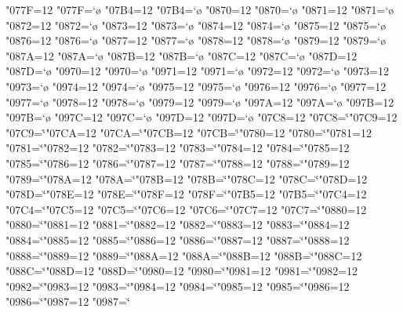 \catcode"077F=12 \lccode"077F=`\o
\catcode"07B4=12 \lccode"07B4=`\o
\catcode"0870=12 \lccode"0870=`\o
\catcode"0871=12 \lccode"0871=`\o
\catcode"0872=12 \lccode"0872=`\o
\catcode"0873=12 \lccode"0873=`\o
\catcode"0874=12 \lccode"0874=`\o
\catcode"0875=12 \lccode"0875=`\o
\catcode"0876=12 \lccode"0876=`\o
\catcode"0877=12 \lccode"0877=`\o
\catcode"0878=12 \lccode"0878=`\o
\catcode"0879=12 \lccode"0879=`\o
\catcode"087A=12 \lccode"087A=`\o
\catcode"087B=12 \lccode"087B=`\o
\catcode"087C=12 \lccode"087C=`\o
\catcode"087D=12 \lccode"087D=`\o
\catcode"0970=12 \lccode"0970=`\o
\catcode"0971=12 \lccode"0971=`\o
\catcode"0972=12 \lccode"0972=`\o
\catcode"0973=12 \lccode"0973=`\o
\catcode"0974=12 \lccode"0974=`\o
\catcode"0975=12 \lccode"0975=`\o
\catcode"0976=12 \lccode"0976=`\o
\catcode"0977=12 \lccode"0977=`\o
\catcode"0978=12 \lccode"0978=`\o
\catcode"0979=12 \lccode"0979=`\o
\catcode"097A=12 \lccode"097A=`\o
\catcode"097B=12 \lccode"097B=`\o
\catcode"097C=12 \lccode"097C=`\o
\catcode"097D=12 \lccode"097D=`\o
\catcode"07C8=12 \lccode"07C8=`\r
\catcode"07C9=12 \lccode"07C9=`\r
\catcode"07CA=12 \lccode"07CA=`\r
\catcode"07CB=12 \lccode"07CB=`\r
\catcode"0780=12 \lccode"0780=`\u
\catcode"0781=12 \lccode"0781=`\u
\catcode"0782=12 \lccode"0782=`\u
\catcode"0783=12 \lccode"0783=`\u
\catcode"0784=12 \lccode"0784=`\u
\catcode"0785=12 \lccode"0785=`\u
\catcode"0786=12 \lccode"0786=`\u
\catcode"0787=12 \lccode"0787=`\u
\catcode"0788=12 \lccode"0788=`\u
\catcode"0789=12 \lccode"0789=`\u
\catcode"078A=12 \lccode"078A=`\u
\catcode"078B=12 \lccode"078B=`\u
\catcode"078C=12 \lccode"078C=`\u
\catcode"078D=12 \lccode"078D=`\u
\catcode"078E=12 \lccode"078E=`\u
\catcode"078F=12 \lccode"078F=`\u
\catcode"07B5=12 \lccode"07B5=`\u
\catcode"07C4=12 \lccode"07C4=`\u
\catcode"07C5=12 \lccode"07C5=`\u
\catcode"07C6=12 \lccode"07C6=`\u
\catcode"07C7=12 \lccode"07C7=`\u
\catcode"0880=12 \lccode"0880=`\u
\catcode"0881=12 \lccode"0881=`\u
\catcode"0882=12 \lccode"0882=`\u
\catcode"0883=12 \lccode"0883=`\u
\catcode"0884=12 \lccode"0884=`\u
\catcode"0885=12 \lccode"0885=`\u
\catcode"0886=12 \lccode"0886=`\u
\catcode"0887=12 \lccode"0887=`\u
\catcode"0888=12 \lccode"0888=`\u
\catcode"0889=12 \lccode"0889=`\u
\catcode"088A=12 \lccode"088A=`\u
\catcode"088B=12 \lccode"088B=`\u
\catcode"088C=12 \lccode"088C=`\u
\catcode"088D=12 \lccode"088D=`\u
\catcode"0980=12 \lccode"0980=`\u
\catcode"0981=12 \lccode"0981=`\u
\catcode"0982=12 \lccode"0982=`\u
\catcode"0983=12 \lccode"0983=`\u
\catcode"0984=12 \lccode"0984=`\u
\catcode"0985=12 \lccode"0985=`\u
\catcode"0986=12 \lccode"0986=`\u
\catcode"0987=12 \lccode"0987=`\u
